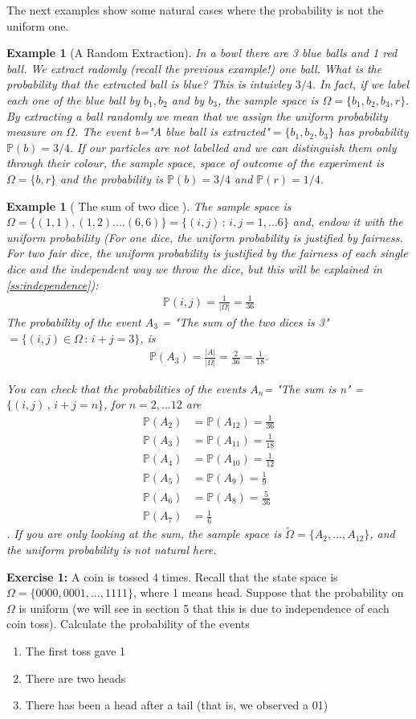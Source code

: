 \documentclass[12pt]{article}
\newtheorem{example}[theorem]{Example}
\newcommand{\<}{{\langle \!\! \langle}}
\renewcommand{\>}{{\rangle \!\! \rangle}}
\newcommand{\bel}[2]{\begin{equation} \label{#1} \begin{split} #2
 					\end{split} \end{equation}}
\begin{document}
The next examples show some natural cases where the probability is not the uniform one. 
\begin{example}[A Random Extraction]
	In a bowl there are 3 blue balls and 1 red ball. We extract radomly (recall the previous example!) one ball. What is the probability that the extracted ball is blue? This is intuivley $3/4$. In fact, if we label each one of the blue ball by $b_1, b_2$ and by $b_3$, the sample space is $\Omega=\{b_1,b_2,b_3, r\}.$ By extracting a ball randomly we mean that we  assign the uniform probability measure on $\Omega$. The event b="A blue ball is extracted"$=\{b_1,b_2,b_3\}$ has probability $\mathbb{P}(b)=3/4.$
	If our particles are not labelled and we can distinguish them only through their colour, the sample space, space of outcome of the experiment is $\Omega=\{b,r\}$ and the probability is $\mathbb{P}(b)=3/4$ and $\mathbb{P}(r)=1/4$. 
\end{example}


\begin{example}[ The sum of two dice ] The sample space is $\Omega=\{(1,1),(1,2)....(6,6)\}=\{(i,j)\,:\, i,j=1,...6\}$ and, endow it with the uniform probability (For one dice, the uniform probability is justified by fairness. For two fair dice, the uniform probability is justified by the fairness of each single dice and the independent way we throw the dice, but this will be explained in \ref{ss:independence}):
\bel{dice}{\mathbb{P}(i,j)=\frac{1}{|\Omega|}=\frac{1}{36}}
The probability of the event $A_3$ = "The sum of the two dices is 3" $= \{(i,j)\in\Omega\,:\,i+j=3\}$, is 
\bel{a3}{\mathbb{P}(A_3)=\frac{|A|}{|\Omega|}=\frac{2}{36}=\frac{1}{18}.}


You can check that the probabilities of the events $A_n $= "The sum is n" = $\{(i,j)\,,\,i+j = n\}$, for $n=2,...12$ are
\bel{sum}{
\mathbb{P}(A_2) &=\mathbb{P}(A_{12})=\frac{1}{36}\\
\mathbb{P}(A_3) &=\mathbb{P}(A_{11})= \frac{1}{18}\\
\mathbb{P}(A_4) &=\mathbb{P}(A_{10})= \frac{1}{12}\\
\mathbb{P}(A_5) &=\mathbb{P}(A_9)= \frac{1}{9}\\
\mathbb{P}(A_6) &=\mathbb{P}(A_8)= \frac{5}{36}\\
\mathbb{P}(A_7) &=\frac{1}{6}}.
If you are only looking at the sum, the sample space is $\tilde{\Omega}=\{A_2,...,A_12\}$, and the uniform probability is not natural here.
\end{example}


\textbf{Exercise 1:} A coin is tossed 4 times. Recall that the state space is $\Omega=\{0000,0001,...,1111\}$, where 1 means head. Suppose that the probability on $\Omega$ is uniform (we will see in section 5 that this is due to independence of each coin toss). Calculate the probability of the events 
\begin{enumerate}
    \item The first toss gave 1 
    \item There are two heads 
    \item There has been a head after a tail (that is, we observed a 01)
    
\end{enumerate}
\end{document}
